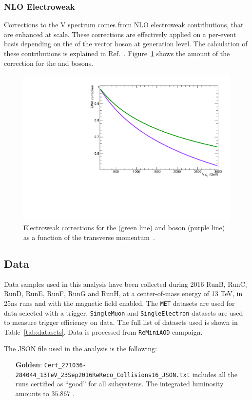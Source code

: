 \subsubsection{NLO Electroweak}

Corrections to the V \pt spectrum comes from NLO electroweak contributions, that are enhanced at \TeV scale. These corrections are effectively applied on a per-event basis depending on the \pt of the vector boson at generation level. The calculation of these contributions is explained in Ref.~\cite{Kallweit:2015dum}. Figure~\ref{fig:ewk} shows the amount of the correction for the \W and \Z bosons.


\begin{figure}[!htb]
 \centering
   \includegraphics[width=.75\textwidth]{figures/EWK.pdf}
 \caption{Electroweak corrections for the \Z (green line) and \W boson (purple line) as a function of the transverse momentum~\cite{Kallweit:2015dum}.}
 \label{fig:ewk}
\end{figure}



\subsection{Data}
\label{sec:data}

Data samples used in this analysis have been collected during 2016 RunB, RunC, RunD, RunE, RunF, RunG and RunH, at a center-of-mass energy of 13 TeV, in 25ns runs and with the magnetic field enabled. The {\tt MET} datasets are used for data selected with a \met trigger. {\tt SingleMuon} and {\tt SingleElectron} datasets are used to measure trigger efficiency on data. The full list of datasets used is shown in Table~\ref{tab:datasets}. Data is processed from {\tt ReMiniAOD} campaign.

The JSON file used in the analysis is the following:
\begin{itemize}
  \item[{\bf Golden}:] {\tt Cert\_271036-284044\_13TeV\_23Sep2016ReReco\_Collisions16\_JSON.txt} includes all the runs certified as ``good'' for all subsystems. The integrated luminosity amounts to $35.867$ \fbinv.
\end{itemize}


